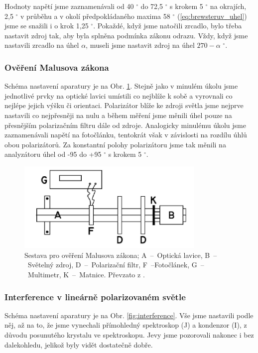 \documentclass[english]{article}
\begin{document}
			Hodnoty napětí jsme zaznamenávali od 40 $^\circ$ do 72,5 $^\circ$ s krokem 5 $^\circ$ na okrajích, 2,5 $^\circ$ v průběhu a v okolí předpokládaného maxima 58 $^\circ$ (\ref{eq:brewsteruv_uhel}) jsme se snažili i o krok 1,25 $^\circ$. Pokaždé, když jsme natočili zrcadlo, bylo třeba nastavit zdroj tak, aby byla splněna podmínka zákonu odrazu. Vždy, když jsme nastavili zrcadlo na úhel $\alpha$, museli jsme nastavit zdroj na úhel $270-\alpha$ $^\circ$.


		\subsubsection{Ověření Malusova zákona}
			Schéma nastavení aparatury je na Obr. \ref{fig:malusuv_zakon}. Stejně jako v minulém úkolu jsme jednotlivé prvky na optické lavici umístili co nejblíže k sobě a vyrovnali co nejlépe jejich výšku či orientaci. Polarizátor blíže ke zdroji světla jsme nejprve nastavili co nejpřesněji na nulu a během měření jsme měnili úhel pouze na přesnějším polarizačním filtru dále od zdroje. Analogicky minulému úkolu jsme zaznamenávali napětí na fotočlánku, tentokrát však v závislosti na rozdílu úhlů obou polarizátorů. Za konstantní polohy polarizátoru jsme tak měnili na analyzátoru úhel od -95 do +95 $^\circ$ s krokem 5 $^\circ$.
			
			\begin{figure}[h!]
			\centering
			\includegraphics[width=9cm]{att/malusuv_zakon.pdf}
			\caption{Sestava pro ověření Malusova zákona; A~--~Optická lavice, B~--~Světelný zdroj, D~--~Polarizační filtr, F~--Fotočlánek, G~--~Multimetr, K~--~Matnice. Převzato z \cite{bib:zadani}.}
			\label{fig:malusuv_zakon}
			\end{figure}

		\subsubsection{Interference v lineárně polarizovaném světle}
			Schéma nastavení aparatury je na Obr. \ref{fig:interference}. Vše jsme nastavili podle něj, až na to, že jsme vynechali přímohledný spektroskop (J) a kondenzor (I), z důvodu posunutého krystalu ve spektroskopu. Jevy jsme pozorovali nakonec i bez dalekohledu, jelikož byly vidět dostatečně dobře. 
			
\end{document}
